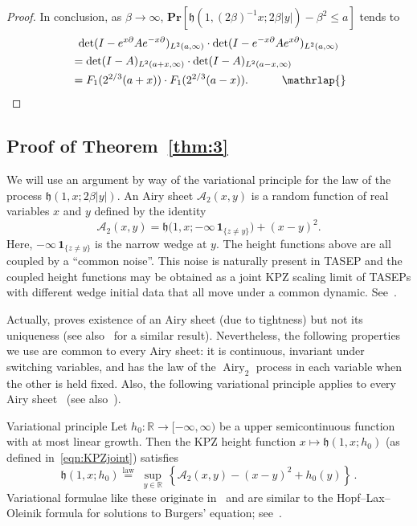 \documentclass[10pt]{amsart}
\theoremstyle{definition}\newtheorem{defi}[theo]{Definition}\newtheorem{rema}[theo]{Remark}\newtheorem{exam}[theo]{Example}\newtheorem{exem}[theo]{Example}\newtheorem{nota}[theo]{Notation}
\DeclareMathOperator{\airy}{Airy}
\newcommand{\pr}[1]{\mathbf{Pr}\left[#1\right]}
\newcommand{\ind}[1]{\mathbf{1}_{\{ #1 \}}}
\newcommand{\R}{\mathbb{R}}
\newcommand{\A}{\mathcal{A}}
\newcommand{\h}{\mathfrak{h}}
\begin{document}
\begin{proof}
In conclusion, as $\beta \to \infty$, $\pr{\h(1,(2\beta)^{-1}x; 2\beta |y|) - \beta^2 \leq a}$ tends to
\begin{multline*}
\det(I - e^{x \partial} A e^{-x\partial})_{L^2(a,\infty)} \cdot \det(I - e^{-x \partial} A e^{x\partial})_{L^2(a,\infty)}\\
\begin{aligned}
&= \det(I - A)_{L^2(a+x,\infty)} \cdot \det(I - A)_{L^2(a-x,\infty)}\;\;\\
&= F_1(2^{2/3}(a+x))\cdot F_1(2^{2/3}(a-x)).\mkern 54mu\mathrlap{\qed}
\end{aligned}
\end{multline*}
\let\qed\relax
\end{proof}

\subsection{Proof of Theorem~\ref{thm:3}} \label{sec:thm3}

We will use an argument by way of the variational principle for the law of the process $\h(1,x; 2\beta |y|)$. An Airy sheet $\A_2(x,y)$ is a random function of real variables $x$ and $y$ defined by the identity
\[
\A_2(x,y) = \h \big (1,x; - \infty \, \ind{z \neq y} \big) + (x-y)^2.
\]
Here, $- \infty \,\ind{z \neq y}$ is the narrow wedge at $y$. The height functions above are all coupled by a ``common noise''. This noise is naturally present in TASEP and the coupled height functions may be obtained as a joint KPZ scaling limit of TASEPs with different wedge initial data that all move under a common dynamic. See~\cite[Section~4.5]{MQR}.

Actually, \cite{MQR} proves existence of an Airy sheet (due to tightness) but not its uniqueness (see also~\cite{P} for a similar result). Nevertheless, the following properties we use are common to every Airy sheet: it is continuous, invariant under switching variables, and has the law of the $\airy_2$ process in each variable when the other is held fixed. Also, the following variational principle applies to every Airy sheet~\cite[Theorem~4.18]{MQR} (see also~\cite{CQR2}).

\begin{enonce*}[remark]{Variational principle}
Let $h_0 : \R \to [-\infty, \infty)$ be a upper semicontinuous function with at most linear growth. Then the KPZ height function $x \mapsto \h(1,x; h_0)$ (as defined in~\eqref{eqn:KPZjoint}) satisfies
\[
\h(1,x; h_0) \overset{\text{law}}{=} \; \sup_{y \in \R}\, \left \{ \A_2(x,y) - (x-y)^2 + h_0(y) \right \}\,.
\]
Variational formulae like these originate in~\cite{J} and are similar to the Hopf--Lax--Oleinik formula for solutions to Burgers' equation; see~\cite{CQR2, S3}.
\end{enonce*}
\end{document}
